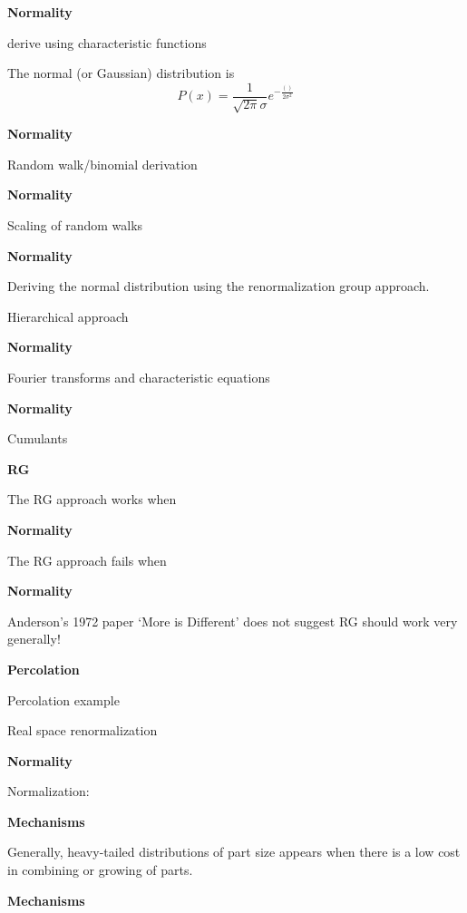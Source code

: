   \textbf{Normality}

  derive using characteristic functions

  The normal (or Gaussian) distribution is
  $$
  P(x) 
  =
  \frac{1}{\sqrt{2\pi}\sigma}
  e^{-\frac{()}{2\sigma^2}}
  $$


  \textbf{Normality}

  Random walk/binomial derivation



  \textbf{Normality}

  Scaling of random walks


  \textbf{Normality}

  Deriving the normal distribution using 
  the renormalization group approach.

  Hierarchical approach


  \textbf{Normality}

  Fourier transforms and
  characteristic equations


  \textbf{Normality}

  Cumulants


  \textbf{RG}

  The RG approach works when


  \textbf{Normality}

  The RG approach fails when


  \textbf{Normality}

  Anderson's 1972 paper `More is Different'
  does not suggest RG should work 
  very generally!



  \textbf{Percolation}

  Percolation example

  Real space renormalization


  \textbf{Normality}

  Normalization:






  \textbf{Mechanisms}

  Generally, heavy-tailed distributions of
  part size appears when there is a low cost in combining or growing
  of parts.



  \textbf{Mechanisms}

